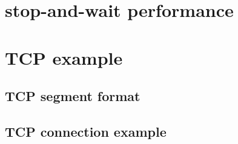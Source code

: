 \section{stop-and-wait performance}




\section{TCP example}

\subsection{TCP segment format}


%

\subsection{TCP connection example}



